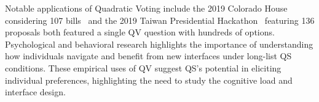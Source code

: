 Notable applications of Quadratic Voting include the 2019 Colorado House considering 107 bills~\cite{coyNewWayVoting2019} and the 2019 Taiwan Presidential Hackathon~\cite{QuadraticVotingFrontend2022} featuring 136 proposals both featured a single QV question with hundreds of options. Psychological and behavioral research highlights the importance of understanding how individuals navigate and benefit from new interfaces under long-list QS conditions. These empirical uses of QV suggest QS's potential in eliciting individual preferences, highlighting the need to study the cognitive load and interface design.


